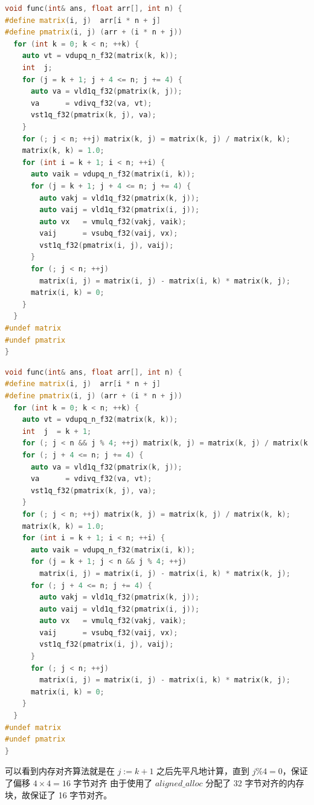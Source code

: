 \documentclass[a4paper]{article}
\begin{document}
\begin{lstlisting}[title=NEON 内存未对齐算法,frame=trbl,language={C++}]
void func(int& ans, float arr[], int n) {
#define matrix(i, j)  arr[i * n + j]
#define pmatrix(i, j) (arr + (i * n + j))
  for (int k = 0; k < n; ++k) {
    auto vt = vdupq_n_f32(matrix(k, k));
    int  j;
    for (j = k + 1; j + 4 <= n; j += 4) {
      auto va = vld1q_f32(pmatrix(k, j));
      va      = vdivq_f32(va, vt);
      vst1q_f32(pmatrix(k, j), va);
    }
    for (; j < n; ++j) matrix(k, j) = matrix(k, j) / matrix(k, k);
    matrix(k, k) = 1.0;
    for (int i = k + 1; i < n; ++i) {
      auto vaik = vdupq_n_f32(matrix(i, k));
      for (j = k + 1; j + 4 <= n; j += 4) {
        auto vakj = vld1q_f32(pmatrix(k, j));
        auto vaij = vld1q_f32(pmatrix(i, j));
        auto vx   = vmulq_f32(vakj, vaik);
        vaij      = vsubq_f32(vaij, vx);
        vst1q_f32(pmatrix(i, j), vaij);
      }
      for (; j < n; ++j)
        matrix(i, j) = matrix(i, j) - matrix(i, k) * matrix(k, j);
      matrix(i, k) = 0;
    }
  }
#undef matrix
#undef pmatrix
}
\end{lstlisting}

\begin{lstlisting}[title=NEON 内存对齐算法,frame=trbl,language={C++}]
void func(int& ans, float arr[], int n) {
#define matrix(i, j)  arr[i * n + j]
#define pmatrix(i, j) (arr + (i * n + j))
  for (int k = 0; k < n; ++k) {
    auto vt = vdupq_n_f32(matrix(k, k));
    int  j  = k + 1;
    for (; j < n && j % 4; ++j) matrix(k, j) = matrix(k, j) / matrix(k, k);
    for (; j + 4 <= n; j += 4) {
      auto va = vld1q_f32(pmatrix(k, j));
      va      = vdivq_f32(va, vt);
      vst1q_f32(pmatrix(k, j), va);
    }
    for (; j < n; ++j) matrix(k, j) = matrix(k, j) / matrix(k, k);
    matrix(k, k) = 1.0;
    for (int i = k + 1; i < n; ++i) {
      auto vaik = vdupq_n_f32(matrix(i, k));
      for (j = k + 1; j < n && j % 4; ++j)
        matrix(i, j) = matrix(i, j) - matrix(i, k) * matrix(k, j);
      for (; j + 4 <= n; j += 4) {
        auto vakj = vld1q_f32(pmatrix(k, j));
        auto vaij = vld1q_f32(pmatrix(i, j));
        auto vx   = vmulq_f32(vakj, vaik);
        vaij      = vsubq_f32(vaij, vx);
        vst1q_f32(pmatrix(i, j), vaij);
      }
      for (; j < n; ++j)
        matrix(i, j) = matrix(i, j) - matrix(i, k) * matrix(k, j);
      matrix(i, k) = 0;
    }
  }
#undef matrix
#undef pmatrix
}
\end{lstlisting}

可以看到内存对齐算法就是在 $j := k + 1$ 之后先平凡地计算，直到 $j \% 4 = 0$，保证了偏移 $4 × 4 = 16$ 字节对齐 由于使用了 $aligned\_alloc$ 分配了 32 字节对齐的内存块，故保证了 16 字节对齐。
\end{document}
